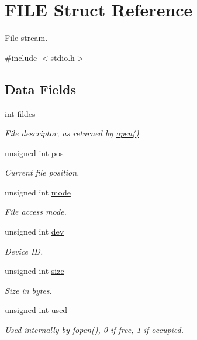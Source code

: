 \hypertarget{structFILE}{}\section{F\+I\+L\+E Struct Reference}
\label{structFILE}


File stream.  




{\ttfamily \#include $<$stdio.\+h$>$}

\subsection*{Data Fields}
\begin{DoxyCompactItemize}
\item 
int \hyperlink{structFILE_a03eb666eb26d69532cabfd9041848875}{fildes}
\begin{DoxyCompactList}\small\item\em File descriptor, as returned by \hyperlink{fcntl_8h_a3ad75e4ab5b8343998fbdb4b40c0973b}{open()} \end{DoxyCompactList}\item 
unsigned int \hyperlink{structFILE_aad42c1377afb068e9c0f015961657a3c}{pos}
\begin{DoxyCompactList}\small\item\em Current file position. \end{DoxyCompactList}\item 
unsigned int \hyperlink{structFILE_ae65fa42375bf2dd80303a67a562d7783}{mode}
\begin{DoxyCompactList}\small\item\em File access mode. \end{DoxyCompactList}\item 
unsigned int \hyperlink{structFILE_ae0766e84f084e6297ae04c869bd06974}{dev}
\begin{DoxyCompactList}\small\item\em Device I\+D. \end{DoxyCompactList}\item 
unsigned int \hyperlink{structFILE_a52a41fff17507a76ddf9cd7e1dc41379}{size}
\begin{DoxyCompactList}\small\item\em Size in bytes. \end{DoxyCompactList}\item 
unsigned int \hyperlink{structFILE_a4fe302cf95bc53156809770fd1cc4278}{used}
\begin{DoxyCompactList}\small\item\em Used internally by \hyperlink{stdio_8h_a61171f829f6067fa0c9936fc4e0cbb82}{fopen()}, 0 if free, 1 if occupied. \end{DoxyCompactList}\item 

\end{DoxyCompactItemize}

